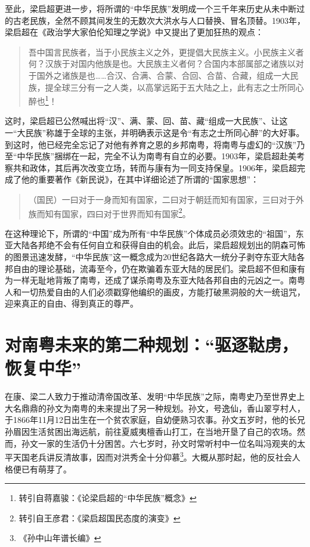 至此，梁启超更进一步，将所谓的“中华民族”发明成一个三千年来历史从未中断过的古老民族，全然不顾其间发生的无数次大洪水与人口替换、冒名顶替。1903年，梁启超在《政治学大家伯伦知理之学说》中又提出了更加狂热的观点：

\begin{quote}
吾中国言民族者，当于小民族主义之外，更提倡大民族主义。小民族主义者何？汉族于对国内他族是也。大民族主义者何？合国内本部属部之诸族以对于国外之诸族是也……合汉、合满、合蒙、合回、合苗、合藏，组成一大民族，提全球三分有一之人类，以高掌远跖于五大陆之上，此有志之士所同心醉也\footnote{转引自蒋嘉骏：《论梁启超的“中华民族”概念》}！
\end{quote}

这时，梁启超已公然喊出将“汉”、满、蒙、回、苗、藏“组成一大民族”、让这一“大民族”称雄于全球的主张，并明确表示这是令“有志之士所同心醉”的大好事。到这时，他已经完全忘记了对他有养育之恩的乡邦南粤，将南粤与虚幻的“汉族”乃至“中华民族”捆绑在一起，完全不认为南粤有自立的必要。1903年，梁启超赴美考察共和政体，其后再次改变立场，转而与康有为一同支持保皇。1906年，梁启超完成了他的重要著作《新民说》，在其中详细论述了所谓的“国家思想”：

\begin{quote}
（国民）一曰对于一身而知有国家，二曰对于朝廷而知有国家，三曰对于外族而知有国家，四曰对于世界而知有国家\footnote{转引自王彦君：《梁启超国民态度的演变》}。
\end{quote}

在这种理论下，所谓的“中国”成为所有“中华民族”个体成员必须效忠的“祖国”，东亚大陆各邦绝不会有任何自立和获得自由的机会。此后，梁启超规划出的阴森可怖的图景迅速发酵，“中华民族”这一概念成为20世纪各路大一统分子剥夺东亚大陆各邦自由的理论基础，流毒至今，仍在欺骗着东亚大陆的居民们。梁启超不但和康有为一样无耻地背叛了南粤，还成了谋杀南粤及东亚大陆各邦自由的元凶之一。南粤人和一切热爱自由的人们必须戳穿他编织的画皮，方能打破黑洞般的大一统诅咒，迎来真正的自由、得到真正的尊严。


\section{对南粤未来的第二种规划：“驱逐鞑虏，恢复中华”}

在康、梁二人致力于推动清帝国改革、发明“中华民族”之际，南粤史乃至世界史上大名鼎鼎的孙文为南粤的未来提出了另一种规划。孙文，号逸仙，香山翠亨村人，于1866年11月12日出生在一个贫农家庭，自幼便熟习农事。孙文五岁时，他的长兄孙眉因生活贫困出海远航，前往夏威夷檀香山打工，在当地开垦了自己的农场。然而，孙文一家的生活仍十分困苦。六七岁时，孙文时常听村中一位名叫冯观夹的太平天国老兵讲反清故事，因而对洪秀全十分仰慕\footnote{《孙中山年谱长编》}。大概从那时起，他的反社会人格便已有萌芽了。

